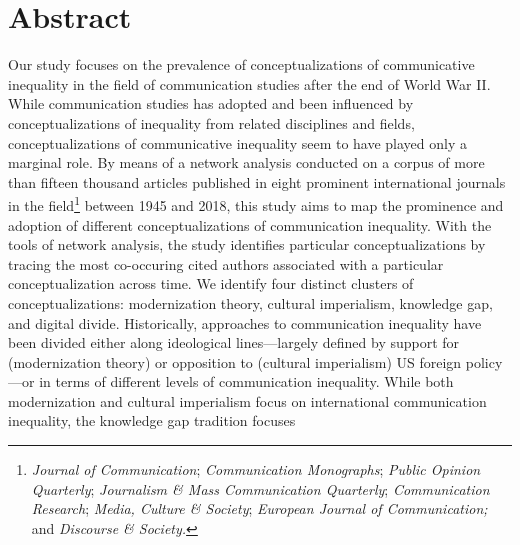\documentclass{tufte-handout}
\begin{document}
\begin{titlepage}
\begin{fullwidth}
\end{fullwidth}



\hypertarget{abstract}{%
\section{Abstract}\label{abstract}}

Our study focuses on the prevalence of conceptualizations of
communicative inequality in the field of communication studies after the
end of World War II. While communication studies has adopted and been
influenced by conceptualizations of inequality from related disciplines
and fields, conceptualizations of communicative inequality seem to have
played only a marginal role. By means of a network analysis conducted on
a corpus of more than fifteen thousand articles published in eight
prominent international journals in the field\footnote{\emph{Journal of
  Communication}; \emph{Communication Monographs}; \emph{Public Opinion
  Quarterly}; \emph{Journalism \& Mass Communication Quarterly};
  \emph{Communication Research}; \emph{Media, Culture \& Society};
  \emph{European Journal of Communication;} and \emph{Discourse \&
  Society.}} between 1945 and 2018, this study aims to map the
prominence and adoption of different conceptualizations of communication
inequality. With the tools of network analysis, the study identifies
particular conceptualizations by tracing the most co-occuring cited
authors associated with a particular conceptualization across time. We
identify four distinct clusters of conceptualizations: modernization
theory, cultural imperialism, knowledge gap, and digital divide.
Historically, approaches to communication inequality have been divided
either along ideological lines---largely defined by support for
(modernization theory) or opposition to (cultural imperialism) US
foreign policy---or in terms of different levels of communication
inequality. While both modernization and cultural imperialism focus on
international communication inequality, the knowledge gap tradition
focuses

\enlargethispage{2\baselineskip}

\vspace*{2em}



 \end{titlepage}
\end{document}
